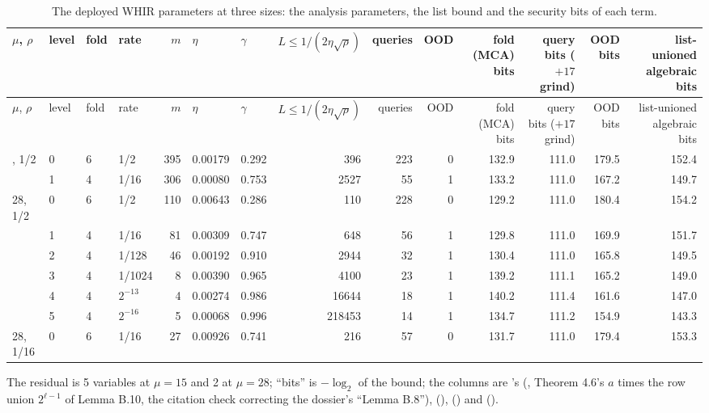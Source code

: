 \begin{landscape}
{\footnotesize\setlength{\tabcolsep}{3.5pt}
\begin{longtable}{@{}llllrllrrrrrrr@{}}
\caption{The deployed WHIR parameters at three sizes: the analysis parameters, the list bound and the
security bits of each term.}\label{tab:gen-opening-params}\\
\toprule
$μ$, $ρ$ & level & fold & rate & $m$ & $η$ & $γ$ & $L ≤ 1/(2η\sqrt{ρ})$ & queries & OOD & fold (MCA) bits
  & query bits ($+17$ grind) & OOD bits & list-unioned algebraic bits \\
\midrule
\endfirsthead
\toprule
$μ$, $ρ$ & level & fold & rate & $m$ & $η$ & $γ$ & $L ≤ 1/(2η\sqrt{ρ})$ & queries & OOD & fold (MCA) bits
  & query bits ($+17$ grind) & OOD bits & list-unioned algebraic bits \\
\midrule
\endhead
\bottomrule
\endfoot
15, 1/2 & 0 & 6 & 1/2 & 395 & 0.00179 & 0.292 & 396 & 223 & 0 & 132.9 & 111.0 & 179.5 & 152.4 \\
        & 1 & 4 & 1/16 & 306 & 0.00080 & 0.753 & 2527 & 55 & 1 & 133.2 & 111.0 & 167.2 & 149.7 \\
\midrule
28, 1/2 & 0 & 6 & 1/2 & 110 & 0.00643 & 0.286 & 110 & 228 & 0 & 129.2 & 111.0 & 180.4 & 154.2 \\
        & 1 & 4 & 1/16 & 81 & 0.00309 & 0.747 & 648 & 56 & 1 & 129.8 & 111.0 & 169.9 & 151.7 \\
        & 2 & 4 & 1/128 & 46 & 0.00192 & 0.910 & 2944 & 32 & 1 & 130.4 & 111.0 & 165.8 & 149.5 \\
        & 3 & 4 & 1/1024 & 8 & 0.00390 & 0.965 & 4100 & 23 & 1 & 139.2 & 111.1 & 165.2 & 149.0 \\
        & 4 & 4 & $2^{-13}$ & 4 & 0.00274 & 0.986 & 16644 & 18 & 1 & 140.2 & 111.4 & 161.6 & 147.0 \\
        & 5 & 4 & $2^{-16}$ & 5 & 0.00068 & 0.996 & 218453 & 14 & 1 & 134.7 & 111.2 & 154.9 & 143.3 \\
\midrule
28, 1/16 & 0 & 6 & 1/16 & 27 & 0.00926 & 0.741 & 216 & 57 & 0 & 131.7 & 111.0 & 179.4 & 153.3 \\
\end{longtable}
}
\end{landscape}

\begin{sloppypar}
The residual is 5 variables at $μ = 15$ and 2 at $μ = 28$; ``bits'' is $−\log_2$ of the bound; the
columns are 's  (, Theorem 4.6's $a$
times the row union $2^{ℓ−1}$ of Lemma B.10, the citation check correcting the dossier's ``Lemma
B.8''),  (),
 () and  ().
\end{sloppypar}

